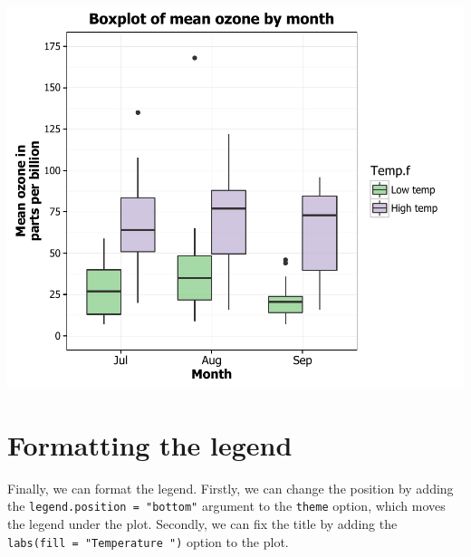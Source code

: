 \documentclass[]{article}
\begin{document}
\begin{center}\includegraphics{10_Boxplots_pdf/box_18-1} \end{center}

\section{Formatting the legend}\label{formatting-the-legend}

Finally, we can format the legend. Firstly, we can change the position
by adding the \texttt{legend.position\ =\ "bottom"} argument to the
\texttt{theme} option, which moves the legend under the plot. Secondly,
we can fix the title by adding the
\texttt{labs(fill\ =\ "Temperature\ ")} option to the plot.
\end{document}
